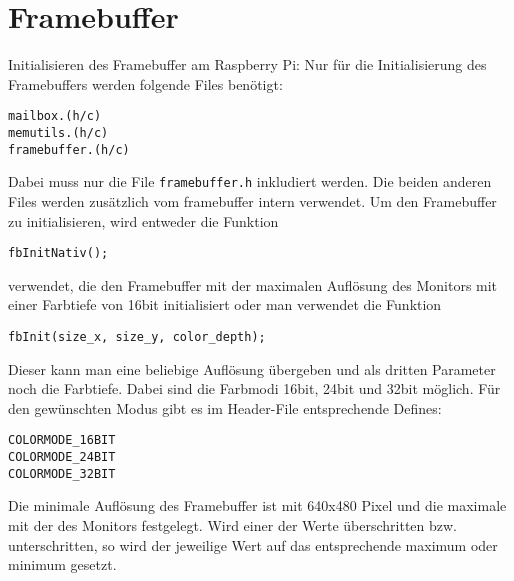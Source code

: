 \documentclass[a4paper,10pt]{scrartcl}
\begin{document}
\section*{Framebuffer}
Initialisieren des Framebuffer am Raspberry Pi:
Nur für die Initialisierung des Framebuffers werden folgende Files benötigt:
\begin{verbatim} 
mailbox.(h/c)
memutils.(h/c)
framebuffer.(h/c)
\end{verbatim}
Dabei muss nur die File \texttt{framebuffer.h} inkludiert werden. Die beiden 
anderen Files werden zusätzlich vom framebuffer intern verwendet. Um den
Framebuffer zu initialisieren, wird entweder die Funktion
\begin{verbatim} 
fbInitNativ();
\end{verbatim}
verwendet, die den Framebuffer mit der maximalen Auflösung des
Monitors mit einer
Farbtiefe von 16bit initialisiert oder man verwendet die Funktion
\begin{verbatim} 
fbInit(size_x, size_y, color_depth);
\end{verbatim}
Dieser kann man eine beliebige Auflösung übergeben und als dritten Parameter
noch die Farbtiefe.
Dabei sind die Farbmodi 16bit, 24bit und 32bit möglich.
Für den gewünschten Modus gibt es im Header-File entsprechende Defines:
\begin{verbatim} 
COLORMODE_16BIT
COLORMODE_24BIT
COLORMODE_32BIT
\end{verbatim}



Die minimale Auflösung des Framebuffer ist mit 640x480 Pixel und die maximale
mit der des Monitors
festgelegt. Wird einer der Werte überschritten bzw. unterschritten, so wird der
jeweilige Wert auf
das entsprechende maximum oder minimum gesetzt.
\end{document}
